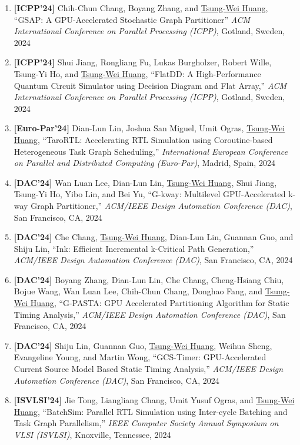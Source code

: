 \documentclass[A4,11pt]{article}
\begin{document}
\begin{enumerate}
    \item \textbf{[ICPP'24]} Chih-Chun Chang, Boyang Zhang, and \underline{Tsung-Wei Huang}, ``GSAP: A GPU-Accelerated Stochastic Graph Partitioner'' \textit{ACM International Conference on Parallel Processing (ICPP)}, Gotland, Sweden, 2024

    \item \textbf{[ICPP'24]} Shui Jiang, Rongliang Fu, Lukas Burgholzer, Robert Wille, Tsung-Yi Ho, and \underline{Tsung-Wei Huang}, ``FlatDD: A High-Performance Quantum Circuit Simulator using Decision Diagram and Flat Array,'' \textit{ACM International Conference on Parallel Processing (ICPP)}, Gotland, Sweden, 2024

    \item \textbf{[Euro-Par'24]} Dian-Lun Lin, Joshua San Miguel, Umit Ogras, \underline{Tsung-Wei Huang}, ``TaroRTL: Accelerating RTL Simulation using Coroutine-based Heterogeneous Task Graph Scheduling,'' \textit{International European Conference on Parallel and Distributed Computing (Euro-Par)}, Madrid, Spain, 2024

    \item \textbf{[DAC'24]} Wan Luan Lee, Dian-Lun Lin, \underline{Tsung-Wei Huang}, Shui Jiang, Tsung-Yi Ho, Yibo Lin, and Bei Yu, ``G-kway: Multilevel GPU-Accelerated k-way Graph Partitioner,'' \textit{ACM/IEEE Design Automation Conference (DAC)}, San Francisco, CA, 2024

    \item \textbf{[DAC'24]} Che Chang, \underline{Tsung-Wei Huang}, Dian-Lun Lin, Guannan Guo, and Shiju Lin, ``Ink: Efficient Incremental k-Critical Path Generation,'' \textit{ACM/IEEE Design Automation Conference (DAC)}, San Francisco, CA, 2024

    \item \textbf{[DAC'24]} Boyang Zhang, Dian-Lun Lin, Che Chang, Cheng-Hsiang Chiu, Bojue Wang, Wan Luan Lee, Chih-Chun Chang, Donghao Fang, and \underline{Tsung-Wei Huang}, ``G-PASTA: GPU Accelerated Partitioning Algorithm for Static Timing Analysis,'' \textit{ACM/IEEE Design Automation Conference (DAC)}, San Francisco, CA, 2024

    \item \textbf{[DAC'24]} Shiju Lin, Guannan Guo, \underline{Tsung-Wei Huang}, Weihua Sheng, Evangeline Young, and Martin Wong, ``GCS-Timer: GPU-Accelerated Current Source Model Based Static Timing Analysis,'' \textit{ACM/IEEE Design Automation Conference (DAC)}, San Francisco, CA, 2024

    \item \textbf{[ISVLSI'24]} Jie Tong, Liangliang Chang, Umit Yusuf Ogras, and \underline{Tsung-Wei Huang}, ``BatchSim: Parallel RTL Simulation using Inter-cycle Batching and Task Graph Parallelism,'' \textit{IEEE Computer Society Annual Symposium on VLSI (ISVLSI)}, Knoxville, Tennessee, 2024


\end{enumerate}
\end{document}
